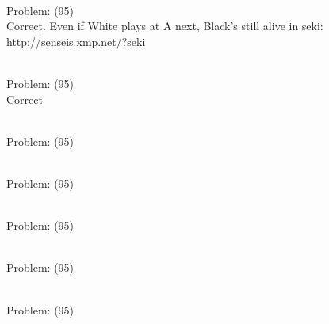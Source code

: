 \documentclass[11pt]{article}
\begin{document}
\begin{minipage}[t]{0.5\textwidth}
  {\centering
  
\\
Problem: (95)\\
Correct. Even if White plays at A next, Black's still alive in seki: http://senseis.xmp.net/?seki\\
  }
\end{minipage}
\begin{minipage}[t]{0.5\textwidth}
  {\centering
  
\\
Problem: (95)\\
Correct\\
  }
\end{minipage}
\begin{minipage}[t]{0.5\textwidth}
  {\centering
  
\\
Problem: (95)\\
  }
\end{minipage}
\begin{minipage}[t]{0.5\textwidth}
  {\centering
  
\\
Problem: (95)\\
  }
\end{minipage}
\begin{minipage}[t]{0.5\textwidth}
  {\centering
  
\\
Problem: (95)\\
  }
\end{minipage}
\begin{minipage}[t]{0.5\textwidth}
  {\centering
  
\\
Problem: (95)\\
  }
\end{minipage}
\begin{minipage}[t]{0.5\textwidth}
  {\centering
  
\\
Problem: (95)\\
  }
\end{minipage}
\end{document}
